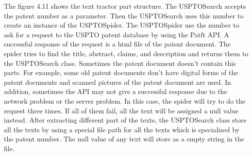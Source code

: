The figure 4.11 shows the text tractor part structure. The USPTOSearch  accepts the patent number as a parameter. Then the USPTOSearch uses this number to create an instance of the USPTOSpider. The USPTOSpider use the number to ask for a request to the USPTO patent database by using the Patft API. A successful response of the request is a html file of the patent document. The spider tries to find the title, abstract, claims, and description and returns them to the USPTOSearch class. Sometimes the patent document doesn't contain this parts. For example, some old patent documents don't have digital forms of the patent documents and scanned pictures of the patent document are used. In addition, sometimes the API may not give a successful response due to the network problem or the server problem. In this case, the spider will try to do the request three times. If all of them fail, all the text will be assigned a null value instead. After extracting different part of the texts, the USPTOSearch class store all the texts by using a special file path for all the texts which is specialized by the patent number. The null value of any text will store as a empty string in the file. 


